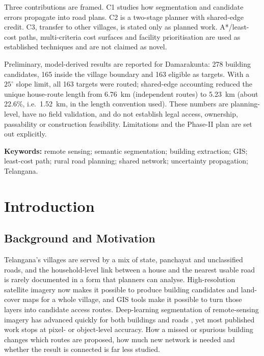 \documentclass[12pt,a4paper]{report}
\begin{document}
Three contributions are framed. C1 studies how segmentation and candidate errors propagate into road plans. C2 is a two-stage planner with shared-edge credit. C3, transfer to other villages, is stated only as planned work. A*/least-cost paths, multi-criteria cost surfaces and facility prioritisation are used as established techniques and are not claimed as novel.

Preliminary, model-derived results are reported for Damarakunta: 278 building candidates, 165 inside the village boundary and 163 eligible as targets. With a $25^{\circ}$ slope limit, all 163 targets were routed; shared-edge accounting reduced the unique house-route length from 6.76~km (independent routes) to 5.23~km (about 22.6\%, i.e.\ 1.52~km, in the length convention used). These numbers are planning-level, have no field validation, and do not establish legal access, ownership, passability or construction feasibility. Limitations and the Phase-II plan are set out explicitly.

\medskip\noindent\textbf{Keywords:} remote sensing; semantic segmentation; building extraction; GIS; least-cost path; rural road planning; shared network; uncertainty propagation; Telangana.
\clearpage

\tableofcontents\clearpage
\listoftables\clearpage
\listoffigures\clearpage


\chapter{Introduction}
\section{Background and Motivation}
Telangana's villages are served by a mix of state, panchayat and unclassified roads, and the household-level link between a house and the nearest usable road is rarely documented in a form that planners can analyse. High-resolution satellite imagery now makes it possible to produce building candidates and land-cover maps for a whole village, and GIS tools make it possible to turn those layers into candidate access routes. Deep-learning segmentation of remote-sensing imagery has advanced quickly for both buildings and roads \cite{L17}, yet most published work stops at pixel- or object-level accuracy. How a missed or spurious building changes which routes are proposed, how much new network is needed and whether the result is connected is far less studied.
\end{document}
